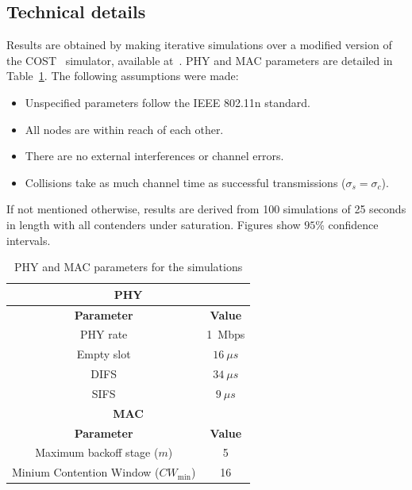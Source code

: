 \documentclass[a4paper,journal]{IEEEtran}
\begin{document}

	\subsection{Technical details}
	Results are obtained by making iterative simulations over a modified version of the COST~\cite{COST} simulator, available at~\cite{sim:parameters}. PHY and MAC parameters are detailed in Table~\ref{tab:mac-params}. The following assumptions were made:
	
	\begin{itemize}
		\item Unspecified parameters follow the IEEE 802.11n standard.
		\item All nodes are within reach of each other.
		\item There are no external interferences or channel errors.
		\item Collisions take as much channel time as successful transmissions ($\sigma_{s}=\sigma_{c}$).
	\end{itemize}
	
	If not mentioned otherwise, results are derived from 100 simulations of 25 seconds in length with all contenders under saturation. Figures show $95$\% confidence intervals.
	
	\begin{table}
		\centering
		\caption{PHY and MAC parameters for the simulations}
		\label{tab:mac-params}
		\begin{tabular}{|c|c|}
			\hline
			\multicolumn{2}{|c|}{{\bfseries PHY}}\\
			\hline
			{\bfseries Parameter} & {\bfseries Value}\\
			\hline
			PHY rate & 1~Mbps\\
			Empty slot & $16~\mu s$\\
			DIFS & $34~\mu s$\\
			SIFS & $9~\mu s$\\
			\hline
			\multicolumn{2}{|c|}{{\bfseries MAC}}\\
			\hline
			{\bfseries Parameter} & {\bfseries Value}\\
			\hline
			Maximum backoff stage ($m$) & 5\\
			Minium Contention Window ($CW_{\min}$) & 16\\		
			\hline
		\end{tabular}
	\end{table}
	
\end{document}
